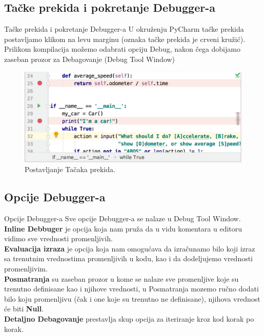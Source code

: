 \documentclass{beamer}
\begin{document}
\subsection{Tačke prekida i pokretanje Debugger-a}
\begin{frame}{Tačke prekida i pokretanje Debugger-a}
U okruženju PyCharm tačke prekida postavljamo klikom na levu marginu (oznaka tačke prekida je crveni kružić).\\
Prilikom kompilacija možemo odabrati opciju Debug, nakon čega dobijamo zaseban prozor za Debagovanje (Debug Tool Window)
\begin{figure}[h!]
\begin{center}
\includegraphics[scale = 0.4]{1}
\end{center}
\caption{Postavljanje Tačaka prekida.}
\label{1}
\end{figure}
    
\end{frame}
\subsection{Opcije Debugger-a}
\begin{frame}{Opcije Debugger-a}
Sve opcije Debugger-a se nalaze u Debug Tool Window.\\
\textbf{Inline Debbuger} je opcija koja nam pruža da u vidu komentara u editoru vidimo sve vrednosti promenljivih.\\
\textbf{Evaluacija izraza} je opcija koja nam omogućava da izračunamo bilo koji izraz sa trenutnim vrednostima promenljivih u kodu, kao i da dodeljujemo vrednosti promenljivim.\\
\textbf{Posmatranja} su zaseban prozor u kome se nalaze sve promenljive koje su trenutno definisane kao i njihove vrednosti, u Posmatranja mozemo ručno dodati bilo koju promenljivu (čak i one koje su trenutno ne definisane), njihova vrednost će biti \textbf{Null}.\\
\textbf{Detaljno Debagovanje} prestavlja skup opcija za iteriranje kroz kod korak po korak.
\end{frame}
\end{document}
